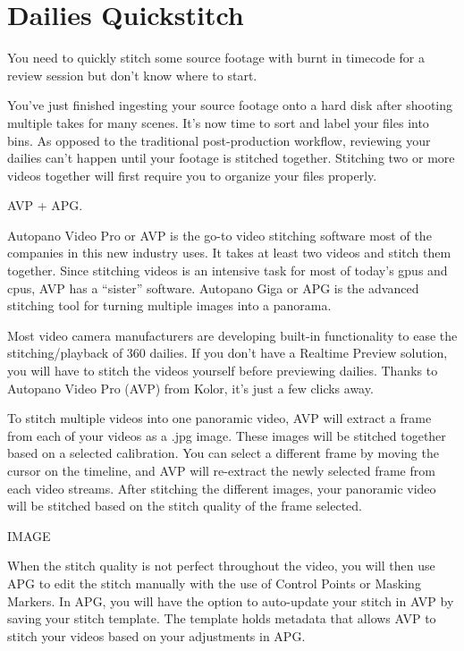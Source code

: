 \chapter{Dailies Quickstitch}
\pagecolor{white}
\label{chap:30}
\begin{fullwidth}

\problem

{\large You need to quickly stitch some source footage with burnt in timecode for a review session but don't know where to start. \par}

You've just finished ingesting your source footage onto a hard disk after shooting multiple takes for many scenes. It's now time to sort and label your files into bins. As opposed to the traditional post-production workflow, reviewing your dailies can't happen until your footage is stitched together. Stitching two or more videos together will first require you to organize your files properly.

\solution

{\large AVP + APG. \par}

Autopano Video Pro or AVP is the go-to video stitching software most of the companies in this new industry uses. It takes at least two videos and stitch them together. Since stitching videos is an intensive task for most of today’s gpus and cpus, AVP has a “sister” software. Autopano Giga or APG is the advanced stitching tool for turning multiple images into a panorama. 

Most video camera manufacturers are developing built-in functionality to ease the stitching/playback of 360 dailies. If you don't have a Realtime Preview solution, you will have to stitch the videos yourself before previewing dailies. Thanks to Autopano Video Pro (AVP) from Kolor, it's just a few clicks away.

To stitch multiple videos into one panoramic video, AVP will extract a frame from each of your videos as a .jpg image. These images will be stitched together based on a selected calibration. You can select a different frame by moving the cursor on the timeline, and AVP will re-extract the newly selected frame from each video streams. After stitching the different images, your panoramic video will be stitched based on the stitch quality of the frame selected. 

IMAGE

When the stitch quality is not perfect throughout the video, you will then use APG to edit the stitch manually with the use of Control Points or Masking Markers. In APG, you will have the option to auto-update your stitch in AVP by saving your stitch template. The template holds metadata that allows AVP to stitch your videos based on your adjustments in APG.


\end{fullwidth}
